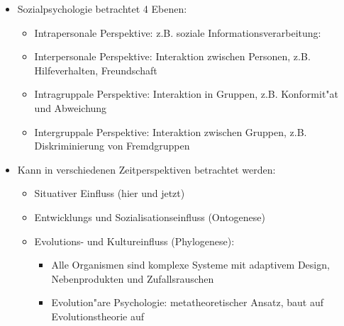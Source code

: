 \begin{itemize}
	\item
		Sozialpsychologie betrachtet 4 Ebenen:
		\begin{itemize}
			\item
				Intrapersonale Perspektive: z.B. soziale Informationsverarbeitung:
			\item
				Interpersonale Perspektive: Interaktion zwischen Personen, z.B.  Hilfeverhalten, Freundschaft
			\item
				Intragruppale Perspektive: Interaktion in Gruppen, z.B. Konformit"at und Abweichung
			\item
				Intergruppale Perspektive: Interaktion zwischen Gruppen, z.B. Diskriminierung von Fremdgruppen
		\end{itemize}
	\item
		Kann in verschiedenen Zeitperspektiven betrachtet werden:
		\begin{itemize}
			\item
				Situativer Einfluss (hier und jetzt)
			\item
				Entwicklungs und Sozialisationseinfluss (Ontogenese)
			\item
				Evolutions- und Kultureinfluss (Phylogenese):
				\begin{itemize}
					\item
						Alle Organismen sind komplexe Systeme mit adaptivem Design, Nebenprodukten und Zufallsrauschen
					\item
						Evolution"are Psychologie: metatheoretischer Ansatz, baut auf Evolutionstheorie auf
				\end{itemize}
		\end{itemize}
\end{itemize}
